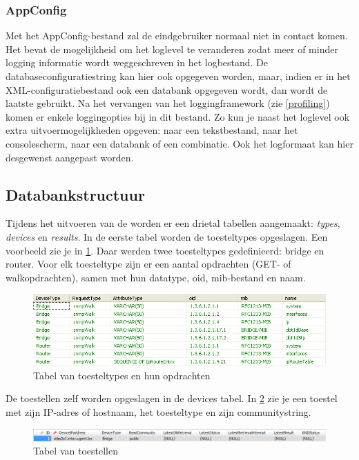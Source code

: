 \subsubsection{AppConfig}
Met het AppConfig-bestand zal de eindgebruiker normaal niet in contact komen.
Het bevat de mogelijkheid om het loglevel te veranderen zodat meer of minder logging informatie wordt weggeschreven in het logbestand.
De databaseconfiguratiestring kan hier ook opgegeven worden,
maar, indien er in het XML-configuratiebestand ook een databank opgegeven wordt, dan wordt de laatste gebruikt.
Na het vervangen van het loggingframework (zie \cref{profiling}) komen er enkele loggingopties bij in dit bestand.
Zo kun je naast het loglevel ook extra uitvoermogelijkheden opgeven: naar een tekstbestand, naar het consolescherm, naar een databank of een combinatie.
Ook het logformaat kan hier desgewenst aangepast worden.

\subsection{Databankstructuur}
\label{snmp-data-retriever-db}
Tijdens het uitvoeren van de \nwmretriever{} worden er een drietal tabellen aangemaakt: \textit{types}, \textit{devices} en \textit{results}.
In de eerste tabel worden de toesteltypes opgeslagen.
Een voorbeeld zie je in \cref{fig-db-types}.
Daar werden twee toesteltypes gedefinieerd: bridge en router.
Voor elk toesteltype zijn er een aantal opdrachten (GET- of walkopdrachten), samen met hun datatype, \gls{oid}, \gls{mib}-bestand en naam.

\begin{figure}[h]
	\centering
	\includegraphics[scale=0.50]{figures/database/types}
	\caption{Tabel van toesteltypes en hun opdrachten}
	\label{fig-db-types}
\end{figure}

De toestellen zelf worden opgeslagen in de devices tabel.
In \cref{fig-db-devices} zie je een toestel met zijn IP-adres of hostnaam, het toesteltype en zijn communitystring.

\begin{figure}[h]
	\centering
	\includegraphics[scale=0.40]{figures/database/devices}
	\caption{Tabel van toestellen}
	\label{fig-db-devices}
\end{figure}

